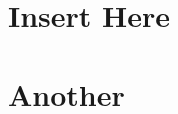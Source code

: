 \begin{appendices}
\appendix
\chapter{Insert Here}
\label{app:Insert Here}	
\newpage

\chapter{Another}
\label{app:Another}
\end{appendices}